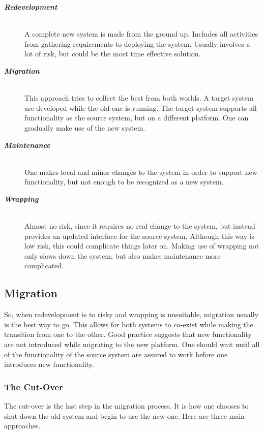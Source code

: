 \begin{description}
\item[\textbf{\textit{Redevelopment}}]\hfill\\
A complete new system is made from the ground up.
Includes all activities from gathering requirements to deploying the system.
Usually involves a lot of risk, but could be the most time effective solution.
\item[\textbf{\textit{Migration}}]\hfill\\
This approach tries to collect the best from both worlds.
A target system are developed while the old one is running.
The target system supports all functionality as the source system, but on a different platform.
One can gradually make use of the new system.
\item[\textbf{\textit{Maintenance}}]\hfill\\
One makes local and minor changes to the system in order to support new functionality, but not enough to be recognized as a new system.
\item[\textbf{\textit{Wrapping}}]\hfill\\
Almost no risk, since it requires no real change to the system, but instead provides an updated interface for the source system. Although this way is low risk, this could complicate things later on. Making use of wrapping not only slows down the system, but also makes maintenance more complicated.
\end{description} 

\subsection{Migration}
So, when redevelopment is to risky and wrapping is unsuitable, migration usually is the best way to go. This allows for both systems to co-exist while making the transition from one to the other.
Good practice suggests that new functionality are not introduced while migrating to the new platform.
One should wait until all of the functionality of the source system are assured to work before one introduces new functionality.

\subsubsection{The Cut-Over}
The cut-over is the last step in the migration process. 
It is how one chooses to shut down the old system and begin to use the new one.
Here are three main approaches.

